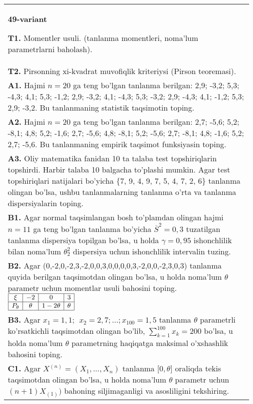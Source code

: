 \documentclass{article}
\begin{document}
\begin{tabular}{m{17cm}}
\textbf{49-variant}
\newline

\textbf{T1.} 
Momentler usuli. (tanlanma momentleri, noma'lum parametrlarni baholash).
\\
\textbf{T2.} 
Pirsonning xi-kvadrat muvofiqlik kriteriysi (Pirson teoremasi).
\\
\textbf{A1.} 
Hajmi \(n = 20\) ga teng bo'lgan tanlanma berilgan: 2,9; -3,2; 5,3; -4,3; 4,1; 5,3; -1,2; 2,9; -3,2; 4,1; -4,3; 5,3; -3,2; 2,9; -4,3; 4,1; -1,2; 5,3; 2,9; -3,2. Bu tanlanmaning statistik taqsimotin toping.
\\
\textbf{A2.} 
Hajmi \(n = 20\) ga teng bo'lgan tanlanma berilgan: 2,7; -5,6; 5,2; -8,1; 4,8; 5,2; -1,6; 2,7; -5,6; 4,8; -8,1; 5,2; -5,6; 2,7; -8,1; 4,8; -1,6; 5,2; 2,7; -5,6. Bu tanlanmaning empirik taqsimot funksiyasin toping.
\\
\textbf{A3.} 
Oliy matematika fanidan 10 ta talaba test topshiriqlarin topshirdi. Harbir talaba 10 balgacha to'plashi mumkin. Agar test topshiriqlari natijalari bo'yicha \{7, 9, 4, 9, 7, 5, 4, 7, 2, 6\} tanlanma olingan bo'lsa, ushbu tanlanmalarning tanlanma o'rta va tanlanma dispersiyalarin toping.
\\
\textbf{B1.} 
Agar normal taqsimlangan bosh to'plamdan olingan hajmi \(n = 11\) ga teng bo'lgan tanlanma bo'yicha \({\overline{S}}^{2} = 0,3\) tuzatilgan tanlanma dispersiya topilgan bo'lsa, u holda \(\gamma = 0,95\) ishonchlilik bilan noma'lum \(\theta_{2}^{2}\) dispersiya uchun ishonchlilik intervalin tuzing.
\\
\textbf{B2.} 
Agar (0,-2,0,-2,3,-2,0,0,3,0,0,0,0,3,-2,0,0,-2,3,0,3) tanlanma quyida berilgan taqsimotdan olingan bo'lsa, u holda noma'lum \(\theta\) parametr uchun momentlar usuli bahosini toping.
$\begin{array}{|c|c|c|c|}
    \hline
    \xi & - 2 & 0 & 3 \\
    \hline
    P_{\theta} & \theta & 1 - 2\theta & \theta \\
    \hline
\end{array}$
\\
\textbf{B3.} 
Agar \(x_{1} = 1,1;\ \ x_{2} = 2,7;\ldots;x_{100} = 1,5\) tanlanma \(\theta\) parametrli ko'rsatkichli taqsimotdan olingan bo'lib, \(\sum_{k = 1}^{100}x_{k} = 200\) bo'lsa, u holda noma'lum \(\theta\) parametrning haqiqatga maksimal o'xshashlik bahosini toping.
\\
\textbf{C1.} 
Agar \(X^{(n)} = \left( X_{1},...,X_{n} \right)\) tanlanma \(\lbrack 0,\theta\rbrack\) oraliqda tekis taqsimotdan olingan bo'lsa, u holda noma'lum \(\theta\) parametr uchun \((n + 1)X_{(1)})\) bahoning siljimaganligi va asosliligini tekshiring.

\end{tabular}
\end{document}
